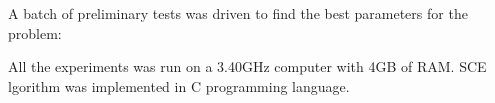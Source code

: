 A batch of preliminary tests was driven to find the best parameters for the
problem:\vspace{-2mm}
\vspace{30pt}
\begin{center}
  
\end{center}
\vspace{30pt}
All the experiments was run on a 3.40GHz computer with 4GB of RAM.
SCE lgorithm was implemented in C programming language.
